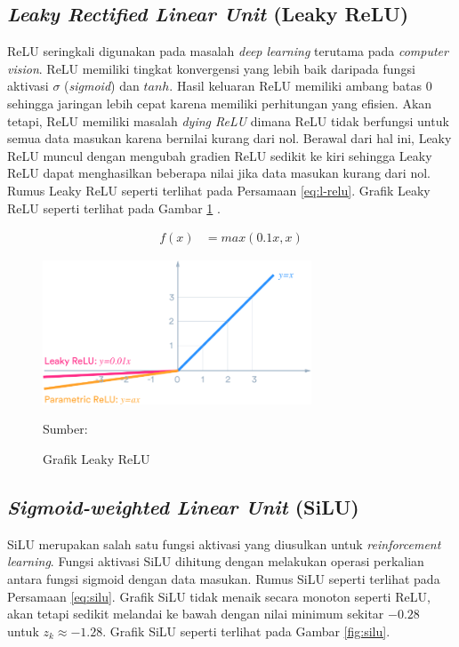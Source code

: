     \subsection{\textit{Leaky Rectified Linear Unit} (Leaky ReLU)}
    ReLU seringkali digunakan pada masalah \textit{deep learning} terutama pada \textit{computer vision}. ReLU memiliki tingkat konvergensi yang lebih baik daripada fungsi aktivasi $\sigma$ (\textit{sigmoid}) dan $tanh$. Hasil keluaran ReLU memiliki ambang batas $0$ sehingga jaringan lebih cepat karena memiliki perhitungan yang efisien. Akan tetapi, ReLU memiliki masalah \textit{dying ReLU} dimana ReLU tidak berfungsi untuk semua data masukan karena bernilai kurang dari nol. Berawal dari hal ini, Leaky ReLU muncul dengan mengubah gradien ReLU sedikit ke kiri sehingga Leaky ReLU dapat menghasilkan beberapa nilai jika data masukan kurang dari nol. Rumus Leaky ReLU seperti terlihat pada Persamaan \ref{eq:l-relu}. Grafik Leaky ReLU seperti terlihat pada Gambar \ref{fig:l-relu} \citep{Xu2015}.

    \begin{align}
        \label{eq:l-relu}
        f(x) &= max(0.1x, x)
    \end{align}

    \begin{figure}[H]
        \begin{center}
            \includegraphics[width=8cm]{img/bab2/lrelu.png}
            \caption{Grafik Leaky ReLU}
            \label{fig:l-relu}
            Sumber: \citep{Xu2015}
        \end{center}
    \end{figure}

    \subsection{\textit{Sigmoid-weighted Linear Unit} (SiLU)}
    SiLU merupakan salah satu fungsi aktivasi yang diusulkan untuk \textit{reinforcement learning}. Fungsi aktivasi SiLU dihitung dengan melakukan operasi perkalian antara fungsi sigmoid dengan data masukan. Rumus SiLU seperti terlihat pada Persamaan \ref{eq:silu}. Grafik SiLU tidak menaik secara monoton seperti ReLU, akan tetapi sedikit melandai ke bawah dengan nilai minimum sekitar $-0.28$ untuk $z_k \approx -1.28$. Grafik SiLU seperti terlihat pada Gambar \ref{fig:silu}.

